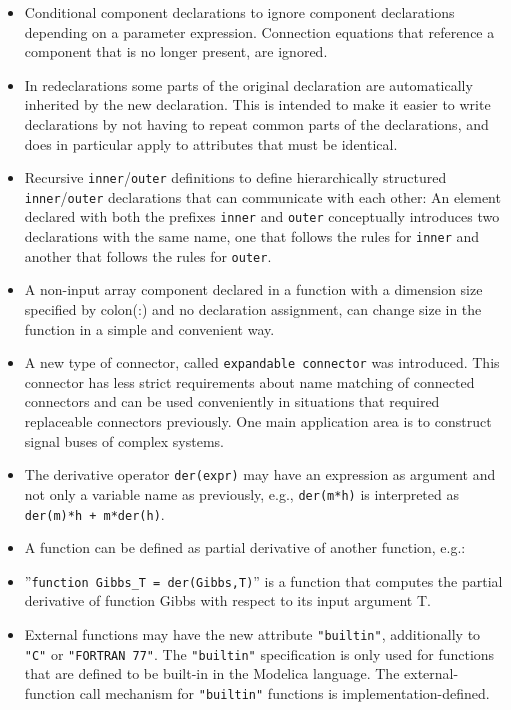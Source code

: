 \begin{itemize}
\item
  Conditional component declarations to ignore component declarations
  depending on a parameter expression. Connection equations that
  reference a component that is no longer present, are ignored.
\item
  In redeclarations some parts of the original declaration are
  automatically inherited by the new declaration. This is intended to
  make it easier to write declarations by not having to repeat common
  parts of the declarations, and does in particular apply to attributes
  that must be identical.
\item
  Recursive \lstinline!inner!/\lstinline!outer! definitions to define hierarchically structured
  \lstinline!inner!/\lstinline!outer! declarations that can communicate with each other: An
  element declared with both the prefixes \lstinline!inner! and \lstinline!outer! conceptually
  introduces two declarations with the same name, one that follows the
  rules for \lstinline!inner! and another that follows the rules for \lstinline!outer!.
\item
  A non-input array component declared in a function with a dimension
  size specified by colon(:) and no declaration assignment, can change
  size in the function in a simple and convenient way.
\item
  A new type of connector, called \lstinline!expandable connector! was
  introduced. This connector has less strict requirements about name
  matching of connected connectors and can be used conveniently in
  situations that required replaceable connectors previously. One main
  application area is to construct signal buses of complex systems.
\item
  The derivative operator \lstinline!der(expr)! may have an expression as argument
  and not only a variable name as previously, e.g., \lstinline!der(m*h)! is
  interpreted as \lstinline!der(m)*h + m*der(h)!.
\item
  A function can be defined as partial derivative of another function,
  e.g.:
\item
  ''\lstinline!function Gibbs_T = der(Gibbs,T)!'' is a function that computes the
  partial derivative of function Gibbs with respect to its input
  argument T.
\item
  External functions may have the new attribute \lstinline!"builtin"!, additionally
  to \lstinline!"C"! or \lstinline!"FORTRAN 77"!. The \lstinline!"builtin"! specification is only used
  for functions that are defined to be built-in in the Modelica
  language. The external-function call mechanism for \lstinline!"builtin"! functions
  is implementation-defined.
\end{itemize}

